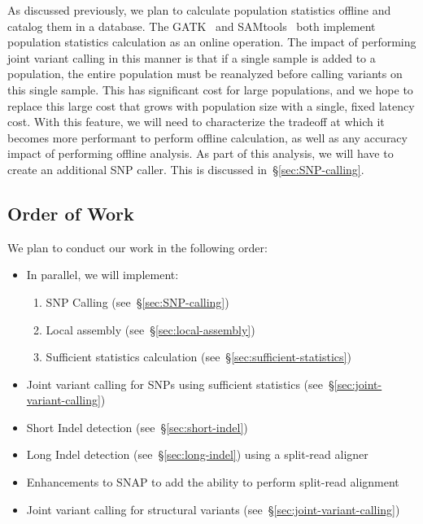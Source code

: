 \documentclass[11pt]{article}
\begin{document}
As discussed previously, we plan to calculate population statistics offline and catalog them in a database.
The GATK~\cite {mckenna10} and SAMtools~\cite{li11} both implement population statistics calculation as an online operation. The
impact of performing joint variant calling in this manner is that if a single sample is added to a population, the entire population
must be reanalyzed before calling variants on this single sample. This has significant cost for large populations, and we hope to
replace this large cost that grows with population size with a single, fixed latency cost. With this feature, we will need to characterize
the tradeoff at which it becomes more performant to perform offline calculation, as well as any accuracy impact of performing offline
analysis. As part of this analysis, we will have to create an additional SNP caller. This is discussed in~\S\ref{sec:SNP-calling}.

\subsection{Order of Work}
\label{sec:order-of-work}

We plan to conduct our work in the following order:

\begin{itemize}
\item In parallel, we will implement:
\begin{enumerate}
\item SNP Calling (see~\S\ref{sec:SNP-calling})
\item Local assembly (see~\S\ref{sec:local-assembly})
\item Sufficient statistics calculation (see~\S\ref{sec:sufficient-statistics})
\end{enumerate}
\item Joint variant calling for SNPs using sufficient statistics (see~\S\ref{sec:joint-variant-calling})
\item Short Indel detection (see~\S\ref{sec:short-indel})
\item Long Indel detection (see~\S\ref{sec:long-indel}) using a split-read aligner
\item Enhancements to SNAP to add the ability to perform split-read alignment
\item Joint variant calling for structural variants (see~\S\ref{sec:joint-variant-calling})
\end{itemize}

\appendix
\end{document}
